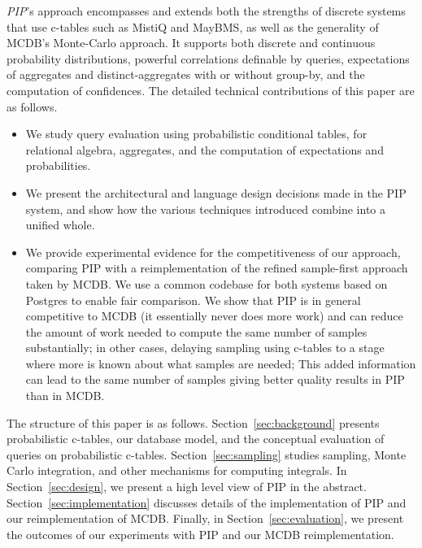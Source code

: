{\em PIP}\/'s approach encompasses and extends both the strengths of discrete systems that use c-tables such as MistiQ and MayBMS, as well as the generality of MCDB's Monte-Carlo approach.  It supports both discrete and continuous probability distributions, powerful correlations definable by queries, expectations of aggregates and distinct-aggregates with or without  group-by,  and the computation of confidences. The detailed technical contributions of this paper are as follows.


\begin{itemize}
\addtolength{\topsep}{-0.3ex}
\addtolength{\labelsep}{-0.3ex}
\addtolength{\itemsep}{-1ex}
\item
We study query evaluation using probabilistic conditional tables, for
relational algebra, aggregates, and the computation of expectations and
probabilities.

\item
We present the architectural and language design decisions made in the
PIP system, and show how the various techniques introduced combine into
a unified whole.

\item
We provide experimental evidence for the competitiveness of our approach, comparing PIP with a reimplementation of the refined sample-first approach taken by MCDB.  We use a common codebase for both systems based on Postgres to enable fair comparison. We show that PIP is in general competitive to MCDB (it essentially never does more work) and can reduce the amount of work needed to compute the same number of samples substantially; in other cases, delaying sampling using c-tables to a stage where more is known about what samples are needed; This added information can lead to the same number of samples giving better quality results in PIP than in MCDB.
\end{itemize}

The structure of this paper is as follows. Section~\ref{sec:background} presents probabilistic c-tables, our database model, and the conceptual  evaluation of queries on probabilistic c-tables. Section~\ref{sec:sampling} studies sampling, Monte
Carlo integration, and other mechanisms for computing integrals.  In Section~\ref{sec:design}, we present a high level view of PIP in the abstract.   Section~\ref{sec:implementation} discusses details of the implementation of PIP and our reimplementation of MCDB.  Finally, in Section~\ref{sec:evaluation}, we present the outcomes of our experiments with PIP and our MCDB reimplementation.